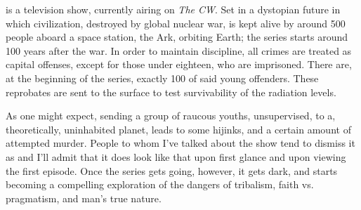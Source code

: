 \documentclass[../butidigress.tex]{subfiles}
\begin{document}
 is a television show, currently airing on \textit{The CW}.
Set in a dystopian future in which civilization, destroyed by global nuclear war, is kept alive by around 500 people aboard a space station, the Ark, orbiting Earth; the series starts around 100 years after the war.
In order to maintain discipline, all crimes are treated as capital offenses, except for those under eighteen, who are imprisoned.
There are, at the beginning of the series, exactly 100 of said young offenders.
These reprobates are sent to the surface to test survivability of the radiation levels.

As one might expect, sending a group of raucous youths, unsupervised, to a, theoretically, uninhabited planet, leads to some hijinks, and a certain amount of attempted murder.
People to whom I've talked about the show tend to dismiss it as  and I'll admit that it does look like that upon first glance and upon viewing the first episode.
Once the series gets going, however, it gets dark, and starts becoming a compelling exploration of the dangers of tribalism, faith vs. pragmatism, and man's true nature.
\end{document}
